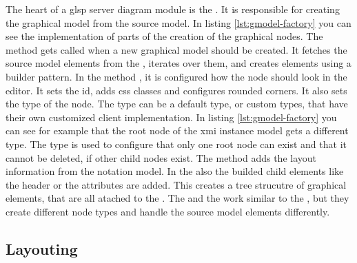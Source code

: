   The heart of a \ac{glsp} server diagram module is the . It is responsible for creating the graphical model from the source model. In listing \ref{lst:gmodel-factory} you can see the implementation of parts of the creation of the graphical nodes. The method  gets called when a new graphical model should be created. It fetches the source model elements from the , iterates over them, and creates  elements using a builder pattern. In the method , it is configured how the node should look in the editor. It sets the id, adds \acs{css} classes and  configures rounded corners. It also sets the type of the node. The type can be a default type, or custom types, that have their own customized client implementation. In listing \ref{lst:gmodel-factory} you can see for example that the root node of the \ac{xmi} instance model gets a different type. The type is used to configure that only one root node can exist and that it cannot be deleted, if other child nodes exist. The method  adds the layout information from the notation model. In the  also the builded child elements like the header or the attributes are added. This creates a tree strucutre of graphical elements, that are all atached to the . The  and the  work similar to the , but they create different node types and handle the source model elements differently.


  \subsection{Layouting}
  \label{subsec:layouting}


